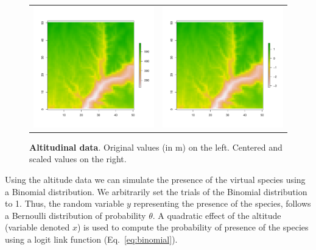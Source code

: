 \documentclass[a4paper, 12pt, leqno]{article}\usepackage[]{graphicx}\usepackage[]{color}
\begin{document}
\begin{figure}[!h] 
  \begin{tabular}{cc}
    \includegraphics[width=8cm]{figures/Altitude1.pdf} &
    \includegraphics[width=8cm]{figures/Altitude2.pdf} \\
  \end{tabular}
  \caption{\textbf{Altitudinal data}. Original values (in m) on the left. Centered and
    scaled values on the right.}
  \label{fig:Altitude}
\end{figure}

Using the altitude data we can simulate the presence of the virtual species using a
Binomial distribution. We arbitrarily set the trials of the Binomial distribution to
1. Thus, the random variable $y$ representing the presence of the species, follows a
Bernoulli distribution of probability $\theta$. A quadratic effect of the altitude
(variable denoted $x$) is used to compute the probability of presence of the species
using a logit link function (Eq.~\ref{eq:binomial}).
\end{document}
